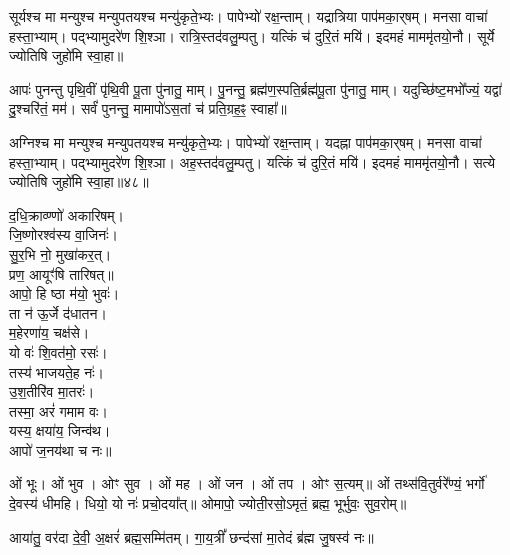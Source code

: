 
सूर्यश्च मा मन्युश्च मन्युपतयश्च मन्यु॑कृते॒भ्यः। पापेभ्यो॑ रक्ष॒न्ताम्। यद्रात्रिया पाप॑मका॒र्‌षम्। मनसा वाचा॑ हस्ता॒भ्याम्। पद्भ्यामुदरे॑ण शि॒श्ञा। रात्रि॒स्तद॑वलु॒म्पतु। यत्किं च॑ दुरि॒तं मयि॑। इदमहं माममृ॑तयो॒नौ। सूर्ये ज्योतिषि जुहो॑मि स्वा॒हा॥


आपः॑ पुनन्तु पृथि॒वीं पृ॑थि॒वी पू॒ता पु॑नातु॒ माम्। पु॒नन्तु॒ ब्रह्म॑ण॒स्पति॒र्ब्रह्म॑पू॒ता पु॑नातु॒ माम्। यदुच्छि॑ष्ट॒मभो᳚ज्यं॒ यद्वा॑ दु॒श्चरि॑तं॒ मम॑। सर्वं॑ पुनन्तु॒ मामापो॑ऽस॒तां च॑ प्रति॒ग्रह॒ꣴ॒ स्वाहा᳚॥


अग्निश्च मा मन्युश्च मन्युपतयश्च मन्यु॑कृते॒भ्यः। पापेभ्यो॑ रक्ष॒न्ताम्। यदह्ना पाप॑मका॒र्‌षम्। मनसा वाचा॑ हस्ता॒भ्याम्। पद्भ्यामुदरे॑ण शि॒श्ञा। अह॒स्तद॑वलु॒म्पतु। यत्किं च॑ दुरि॒तं मयि॑। इदमहं माममृ॑तयो॒नौ। सत्ये ज्योतिषि जुहो॑मि स्वा॒हा॥४८॥



द॒धि॒क्राव्ण्णो॑ अकारिषम्।\\
 जि॒ष्णोरश्व॑स्य वा॒जिनः॑।\\
सु॒र॒भि नो॒ मुखा॑कर॒त्।\\
प्रण॒ आयूꣳ॑षि तारिषत्॥\\



आपो॒ हि ष्ठा म॑यो॒ भुवः॑।\\
ता न॑ ऊ॒र्जे द॑धातन।\\
म॒हेरणा॑य॒ चक्ष॑से।\\
यो वः॑ शि॒वत॑मो॒ रसः॑।\\
तस्य॑ भाजयते॒ह नः॑।\\
उ॒श॒तीरि॑व मा॒तरः॑।\\
तस्मा॒ अरं॑ गमाम वः।\\
यस्य॒ क्षया॑य॒ जिन्व॑थ।\\
आपो॑ ज॒नय॑था च नः॥\\


ओं भूः। ओं भुव। ओꣳ सुव। ओं मह। ओं जन। ओं तप। ओꣳ स॒त्यम्॥
ओं तथ्स॑वि॒तुर्वरे᳚ण्यं॒ भर्गो॑ दे॒वस्य॑ धीमहि। धियो॒ यो नः॑ प्रचो॒दया᳚त्॥
ओमापो॒ ज्योती॒रसो॒ऽमृतं॒ ब्रह्म॒ भूर्भुवः॒ सुव॒रोम्॥


आया॑तु॒ वर॑दा दे॒वी॒ अ॒क्षरं॑ ब्रह्म॒सम्मि॑तम्। गा॒य॒त्रीं᳚ छन्द॑सां मा॒तेदं ब्र॑ह्म जु॒षस्व॑ नः॥

